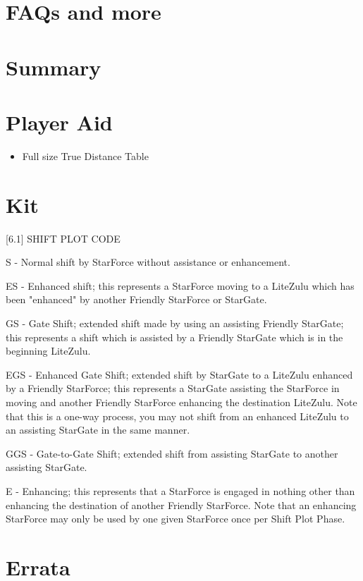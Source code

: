 \documentclass[10pt]{article}
\begin{document}
\begin{multicols}{2}
\section{FAQs and more}

\section{Summary}

\end{multicols}

\section*{Player Aid}

\begin{itemize}
  \item Full size True Distance Table
\end{itemize}

\section*{Kit}

[6.1] SHIFT PLOT CODE


S - Normal shift by StarForce without assistance or
enhancement.


ES - Enhanced shift; this represents a StarForce
moving to a LiteZulu which has been "enhanced" by
another Friendly StarForce or StarGate.


GS - Gate Shift; extended shift made by using an
assisting Friendly StarGate; this represents a shift
which is assisted by a Friendly StarGate which is in
the beginning LiteZulu.


EGS - Enhanced Gate Shift; extended shift by
StarGate to a LiteZulu enhanced by a Friendly
StarForce; this represents a StarGate assisting the
StarForce in moving and another Friendly StarForce
enhancing the destination LiteZulu. Note that this is a
one-way process, you may not shift from an enhanced
LiteZulu to an assisting StarGate in the same manner.


GGS - Gate-to-Gate Shift; extended shift from
assisting StarGate to another assisting StarGate.


E - Enhancing; this represents that a StarForce is
engaged in nothing other than enhancing the
destination of another Friendly StarForce. Note that an
enhancing StarForce may only be used by one given
StarForce once per Shift Plot Phase.

\section{Errata}
\end{document}
